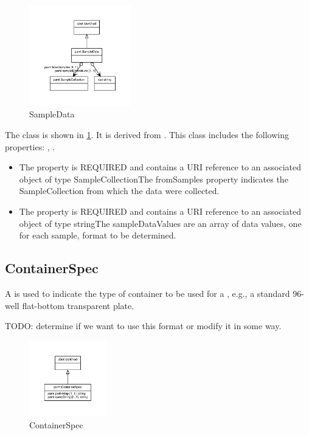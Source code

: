 \begin{figure}[h!]%
\centering%
\includegraphics[width=0.3946808510638298\textwidth]{paml_classes/SampleData_abstraction_hierarchy.pdf}%
\caption{SampleData}%
\label{fig:SampleData}%
\end{figure}

%
The  class is shown in \ref{fig:SampleData}. It is derived from .%
This class includes the following properties: , . %
\begin{itemize}%
\item%
The  property is REQUIRED and contains a URI reference to an associated object of type SampleCollectionThe fromSamples property indicates the SampleCollection from which the data were collected.%
\item%
The  property is REQUIRED and contains a URI reference to an associated object of type stringThe sampleDataValues are an array of data values, one for each sample, format to be determined.%
\end{itemize}%
\subsection{ContainerSpec}%
\label{sec:paml:ContainerSpec}%
A  is used to indicate the type of container to be used for a , e.g.,
        a standard 96-well flat-bottom transparent plate.

        TODO: determine if we want to use this format or modify it in some way.%
\newline%
\linebreak%


\begin{figure}[h!]%
\centering%
\includegraphics[width=0.29936170212765956\textwidth]{paml_classes/ContainerSpec_abstraction_hierarchy.pdf}%
\caption{ContainerSpec}%
\label{fig:ContainerSpec}%
\end{figure}

